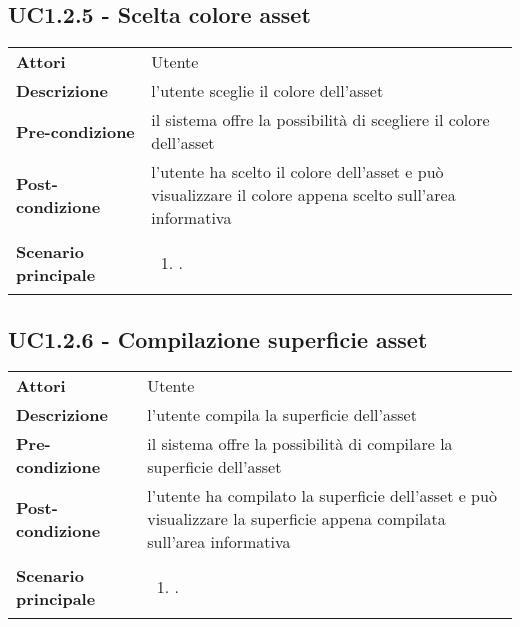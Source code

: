 \subsection{UC1.2.5 - Scelta colore asset} 
\label{sssec:UC1.2.5} 
\def\arraystretch{1.5}
\begin{tabularx}{\textwidth}{l|p{}}
	\rowcolor{I} \multicolumn{2}{c}{\color{white}\textbf{UC1.2.5 - Scelta colore asset}} \\
	\toprule
	\endhead
	\textbf{Attori} & Utente\\
	\textbf{Descrizione} & l'utente sceglie il colore dell'asset\\
	\textbf{Pre-condizione} & il sistema offre la possibilità di scegliere il colore dell'asset\\
	\textbf{Post-condizione} & l'utente ha scelto il colore dell'asset e può visualizzare il colore appena scelto sull'area informativa\\
	\textbf{Scenario principale} & \vspace{-1.2em}\begin{enumerate}[leftmargin=*,noitemsep,nosep]
		\item \nameref{sssec:UC1.2.5}.
	\end{enumerate}\\
	\bottomrule
\end{tabularx}
\subsection{UC1.2.6 - Compilazione superficie asset} 
\label{sssec:UC1.2.6} 
\def\arraystretch{1.5}
\begin{tabularx}{\textwidth}{l|p{}}
	\rowcolor{I} \multicolumn{2}{c}{\color{white}\textbf{UC1.2.6 - Compilazione superficie asset}} \\
	\toprule
	\endhead
	\textbf{Attori} & Utente\\
	\textbf{Descrizione} & l'utente compila la superficie dell'asset\\
	\textbf{Pre-condizione} & il sistema offre la possibilità di compilare la superficie dell'asset\\
	\textbf{Post-condizione} & l'utente ha compilato la superficie dell'asset e può visualizzare la superficie appena compilata sull'area informativa\\
	\textbf{Scenario principale} & \vspace{-1.2em}\begin{enumerate}[leftmargin=*,noitemsep,nosep]
		\item \nameref{sssec:UC1.2.6}.
	\end{enumerate}\\
	\bottomrule
\end{tabularx}
